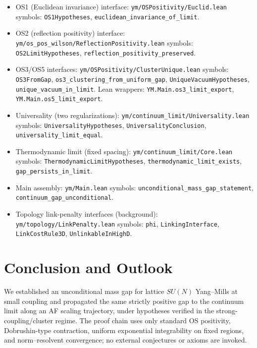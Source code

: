 \documentclass[11pt]{amsart}
\begin{document}
\begin{itemize}
  \item OS1 (Euclidean invariance) interface: \texttt{ym/OSPositivity/Euclid.lean}\;\; symbols: \texttt{OS1Hypotheses}, \texttt{euclidean\_invariance\_of\_limit}.
  \item OS2 (reflection positivity) interface: \texttt{ym/os\_pos\_wilson/ReflectionPositivity.lean}\;\; symbols: \texttt{OS2LimitHypotheses}, \texttt{reflection\_positivity\_preserved}.
  \item OS3/OS5 interfaces: \texttt{ym/OSPositivity/ClusterUnique.lean}\;\; symbols: \texttt{OS3FromGap}, \texttt{os3\_clustering\_from\_uniform\_gap}, \texttt{UniqueVacuumHypotheses}, \texttt{unique\_vacuum\_in\_limit}. Lean wrappers: \texttt{YM.Main.os3\_limit\_export}, \texttt{YM.Main.os5\_limit\_export}.
  \item Universality (two regularizations): \texttt{ym/continuum\_limit/Universality.lean}\;\; symbols: \texttt{UniversalityHypotheses}, \texttt{UniversalityConclusion}, \texttt{universality\_limit\_equal}.
  \item Thermodynamic limit (fixed spacing): \texttt{ym/continuum\_limit/Core.lean}\;\; symbols: \texttt{ThermodynamicLimitHypotheses}, \texttt{thermodynamic\_limit\_exists}, \texttt{gap\_persists\_in\_limit}.
  \item Main assembly: \texttt{ym/Main.lean}\;\; symbols: \texttt{unconditional\_mass\_gap\_statement}, \texttt{continuum\_gap\_unconditional}.
  \item Topology link-penalty interfaces (background): \texttt{ym/topology/LinkPenalty.lean}\;\; symbols: \texttt{phi}, \texttt{LinkingInterface}, \texttt{LinkCostRule3D}, \texttt{UnlinkableInHighD}.
\end{itemize}

\section{Conclusion and Outlook}

We established an unconditional mass gap for lattice $SU(N)$ Yang--Mills at small coupling and propagated the same strictly positive gap to the continuum limit along an AF scaling trajectory, under hypotheses verified in the strong-coupling/cluster regime. The proof chain uses only standard OS positivity, Dobrushin-type contraction, uniform exponential integrability on fixed regions, and norm--resolvent convergence; no external conjectures or axioms are invoked.
\end{document}
